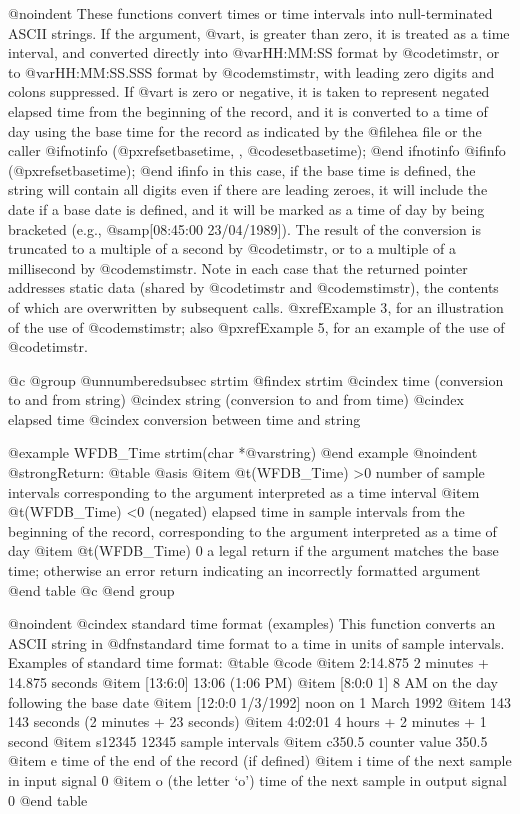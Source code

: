 {{{{{{{{@noindent
These functions convert times or time intervals into null-terminated
ASCII strings.  If the argument, @var{t}, is greater than zero, it is
treated as a time interval, and converted directly into @var{HH:MM:SS}
format by @code{timstr}, or to @var{HH:MM:SS.SSS} format by
@code{mstimstr}, with leading zero digits and colons suppressed.  If
@var{t} is zero or negative, it is taken to represent negated elapsed
time from the beginning of the record, and it is converted to a time of
day using the base time for the record as indicated by the @file{hea}
file or the caller
@ifnotinfo
(@pxref{setbasetime, , @code{setbasetime}});
@end ifnotinfo
@ifinfo
(@pxref{setbasetime});
@end ifinfo
in this case, if the base time is defined, the string will contain all
digits even if there are leading zeroes, it will include the date if a
base date is defined, and it will be marked as a time of day by being
bracketed (e.g., @samp{[08:45:00 23/04/1989]}).  The result of the
conversion is truncated to a multiple of a second by @code{timstr}, or
to a multiple of a millisecond by @code{mstimstr}.  Note in each case
that the returned pointer addresses static data (shared by @code{timstr}
and @code{mstimstr}), the contents of which are overwritten by
subsequent calls.  @xref{Example 3}, for an illustration of the use of
@code{mstimstr}; also @pxref{Example 5}, for an example of the use of
@code{timstr}.

@c @group
@unnumberedsubsec strtim
@findex strtim
@cindex time (conversion to and from string)
@cindex string (conversion to and from time)
@cindex elapsed time
@cindex conversion between time and string

@example
WFDB_Time strtim(char *@var{string})
@end example
@noindent
@strong{Return:}
@table @asis
@item @t{(WFDB_Time) >0}
number of sample intervals corresponding to the argument interpreted as
a time interval
@item @t{(WFDB_Time) <0}
(negated) elapsed time in sample intervals from the beginning of the record,
corresponding to the argument interpreted as a time of day
@item @t{(WFDB_Time)  0}
a legal return if the argument matches the base time;  otherwise an error
return indicating an incorrectly formatted argument
@end table
@c @end group

@noindent
@cindex standard time format (examples)
This function converts an ASCII string in @dfn{standard time format} to a time
in units of sample intervals.  Examples of standard time format:
@table @code
@item 2:14.875
2 minutes + 14.875 seconds
@item [13:6:0]
13:06 (1:06 PM)
@item [8:0:0 1]
8 AM on the day following the base date
@item [12:0:0 1/3/1992]
noon on 1 March 1992
@item 143
143 seconds (2 minutes + 23 seconds)
@item 4:02:01
4 hours + 2 minutes + 1 second
@item s12345
12345 sample intervals
@item c350.5
counter value 350.5
@item e
time of the end of the record (if defined)
@item i
time of the next sample in input signal 0
@item o
(the letter `o') time of the next sample in output signal 0
@end table

}}}}}}}}
